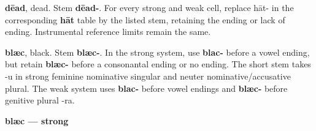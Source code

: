 \textbf{dēad}, dead. Stem \textbf{dēad-}. For every strong and weak cell, replace hāt- in the corresponding \textbf{hāt} table by the listed stem, retaining the ending or lack of ending. Instrumental reference limits remain the same.

\textbf{blæc}, black. Stem \textbf{blæc-}. In the strong system, use \textbf{blac-} before a vowel ending, but retain \textbf{blæc-} before a consonantal ending or no ending. The short stem takes -u in strong feminine nominative singular and neuter nominative/\allowbreak{}accusative plural. The weak system uses \textbf{blac-} before vowel endings and \textbf{blæc-} before genitive plural -ra.

\textbf{blæc — strong}

